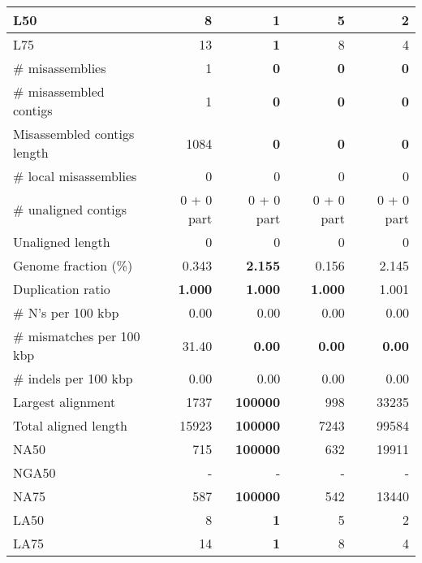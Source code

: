 \documentclass[12pt,a4paper]{article}
\begin{document}
\begin{table}[ht]
\begin{center}
\begin{tabular}{|l*{4}{|r}|}
L50 & 8 & {\bf 1} & 5 & 2 \\ \hline
L75 & 13 & {\bf 1} & 8 & 4 \\ \hline
\# misassemblies & 1 & {\bf 0} & {\bf 0} & {\bf 0} \\ \hline
\# misassembled contigs & 1 & {\bf 0} & {\bf 0} & {\bf 0} \\ \hline
Misassembled contigs length & 1084 & {\bf 0} & {\bf 0} & {\bf 0} \\ \hline
\# local misassemblies & 0 & 0 & 0 & 0 \\ \hline
\# unaligned contigs & 0 + 0 part & 0 + 0 part & 0 + 0 part & 0 + 0 part \\ \hline
Unaligned length & 0 & 0 & 0 & 0 \\ \hline
Genome fraction (\%) & 0.343 & {\bf 2.155} & 0.156 & 2.145 \\ \hline
Duplication ratio & {\bf 1.000} & {\bf 1.000} & {\bf 1.000} & 1.001 \\ \hline
\# N's per 100 kbp & 0.00 & 0.00 & 0.00 & 0.00 \\ \hline
\# mismatches per 100 kbp & 31.40 & {\bf 0.00} & {\bf 0.00} & {\bf 0.00} \\ \hline
\# indels per 100 kbp & 0.00 & 0.00 & 0.00 & 0.00 \\ \hline
Largest alignment & 1737 & {\bf 100000} & 998 & 33235 \\ \hline
Total aligned length & 15923 & {\bf 100000} & 7243 & 99584 \\ \hline
NA50 & 715 & {\bf 100000} & 632 & 19911 \\ \hline
NGA50 & - & - & - & - \\ \hline
NA75 & 587 & {\bf 100000} & 542 & 13440 \\ \hline
LA50 & 8 & {\bf 1} & 5 & 2 \\ \hline
LA75 & 14 & {\bf 1} & 8 & 4 \\ \hline
\end{tabular}
\end{center}
\end{table}
\end{document}
